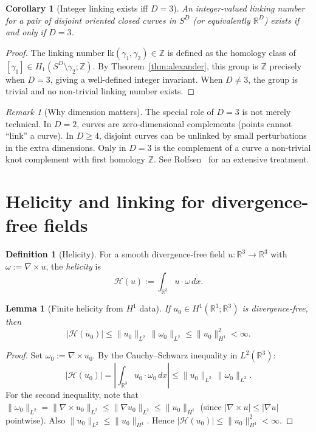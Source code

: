 \documentclass[11pt]{amsart}
\newtheorem{lemma}[theorem]{Lemma}
\newtheorem{corollary}[theorem]{Corollary}
\theoremstyle{definition}
\newtheorem{definition}[theorem]{Definition}
\theoremstyle{remark}
\newtheorem{remark}[theorem]{Remark}
\newcommand{\R}{\mathbb{R}}
\newcommand{\Z}{\mathbb{Z}}
\begin{document}
\begin{corollary}[Integer linking exists iff $D=3$]\label{cor:D3}
An integer-valued linking number for a pair of disjoint oriented closed
curves in $S^D$ (or equivalently $\R^D$) exists if and only if $D=3$.
\end{corollary}
\begin{proof}
The linking number $\mathrm{lk}(\gamma_1,\gamma_2)\in\Z$ is defined as
the homology class of $[\gamma_1]\in H_1(S^D\setminus\gamma_2;\Z)$.
By Theorem~\ref{thm:alexander}, this group is $\Z$ precisely when $D=3$,
giving a well-defined integer invariant.
When $D\neq 3$, the group is trivial and no non-trivial linking number
exists.
\end{proof}

\begin{remark}[Why dimension matters]
The special role of $D=3$ is not merely technical.
In $D=2$, curves are zero-dimensional complements (points cannot
``link'' a curve).  In $D\ge4$, disjoint curves can be unlinked by
small perturbations in the extra dimensions.  Only in $D=3$ is the
complement of a curve a non-trivial knot complement with first homology
$\Z$.  See Rolfsen~\cite{Rolfsen} for an extensive treatment.
\end{remark}

\section{Helicity and linking for divergence-free fields}\label{sec:helicity}

\begin{definition}[Helicity]\label{def:helicity}
For a smooth divergence-free field $u:\R^3\to\R^3$ with
$\omega:=\nabla\times u$, the \emph{helicity} is
\[
\mathcal{H}(u):=\int_{\R^3}u\cdot\omega\,dx.
\]
\end{definition}

\begin{lemma}[Finite helicity from $H^1$ data]\label{lem:finite-helicity}
If $u_0\in H^1(\R^3;\R^3)$ is divergence-free, then
\[
|\mathcal{H}(u_0)|
\le \|u_0\|_{L^2}\,\|\omega_0\|_{L^2}
\le \|u_0\|_{H^1}^2
<\infty.
\]
\end{lemma}
\begin{proof}
Set $\omega_0:=\nabla\times u_0$.  By the Cauchy--Schwarz inequality in
$L^2(\R^3)$:
\[
|\mathcal{H}(u_0)|
=\left|\int_{\R^3}u_0\cdot\omega_0\,dx\right|
\le \|u_0\|_{L^2}\,\|\omega_0\|_{L^2}.
\]
For the second inequality, note that
$\|\omega_0\|_{L^2}=\|\nabla\times u_0\|_{L^2}
\le\|\nabla u_0\|_{L^2}\le\|u_0\|_{H^1}$
(since $|\nabla\times u|\le|\nabla u|$ pointwise).
Also $\|u_0\|_{L^2}\le\|u_0\|_{H^1}$.
Hence $|\mathcal{H}(u_0)|\le\|u_0\|_{H^1}^2<\infty$.
\end{proof}
\end{document}
